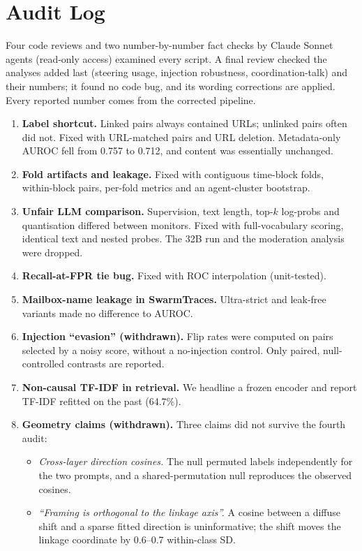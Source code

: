 \documentclass[10.5pt]{article}
\begin{document}
\section{Audit Log}
\label{app:audit}
Four code reviews and two number-by-number fact checks by Claude Sonnet agents (read-only access) examined every script. A final review checked the analyses added last (steering usage, injection robustness, coordination-talk) and their numbers; it found no code bug, and its wording corrections are applied. Every reported number comes from the corrected pipeline.
\begin{enumerate}
\item \textbf{Label shortcut.} Linked pairs always contained URLs; unlinked pairs often did not. Fixed with URL-matched pairs and URL deletion. Metadata-only AUROC fell from 0.757 to 0.712, and content was essentially unchanged.
\item \textbf{Fold artifacts and leakage.} Fixed with contiguous time-block folds, within-block pairs, per-fold metrics and an agent-cluster bootstrap.
\item \textbf{Unfair LLM comparison.} Supervision, text length, top-$k$ log-probs and quantisation differed between monitors. Fixed with full-vocabulary scoring, identical text and nested probes. The 32B run and the moderation analysis were dropped.
\item \textbf{Recall-at-FPR tie bug.} Fixed with ROC interpolation (unit-tested).
\item \textbf{Mailbox-name leakage in SwarmTraces.} Ultra-strict and leak-free variants made no difference to AUROC.
\item \textbf{Injection ``evasion'' (withdrawn).} Flip rates were computed on pairs selected by a noisy score, without a no-injection control. Only paired, null-controlled contrasts are reported.
\item \textbf{Non-causal TF-IDF in retrieval.} We headline a frozen encoder and report TF-IDF refitted on the past (64.7\%).
\item \textbf{Geometry claims (withdrawn).} Three claims did not survive the fourth audit:
  \begin{itemize}
  \item \emph{Cross-layer direction cosines.} The null permuted labels independently for the two prompts, and a shared-permutation null reproduces the observed cosines.
  \item \emph{``Framing is orthogonal to the linkage axis''.} A cosine between a diffuse shift and a sparse fitted direction is uninformative; the shift moves the linkage coordinate by 0.6--0.7 within-class SD.

\end{itemize}
\end{enumerate}
\end{document}
